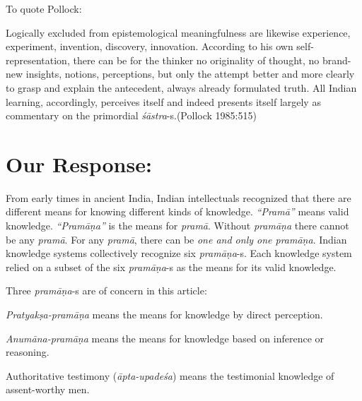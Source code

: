 To quote Pollock:
\begin{myquote}
Logically excluded from epistemological meaningfulness are likewise experience, experiment, invention, discovery, innovation.  According to his own self-representation, there can be for the thinker no originality of thought, no brand-new insights, notions, perceptions, but only the attempt better and more clearly to grasp and explain the antecedent, always already formulated truth. All Indian learning, accordingly, perceives itself and indeed presents itself largely as commentary on the primordial {\sl śāstra}-s.\hfill (Pollock 1985:515)
\end{myquote}

\section*{Our Response:}

From early times in ancient India, Indian intellectuals recognized that there are different means for knowing different kinds of knowledge. {\sl ``Pramā''} means valid knowledge.  {\sl ``Pramāṇa''} is the means for {\sl pramā}.  Without {\sl pramāṇa} there cannot be any {\sl pramā}.  For any {\sl pramā}, there can be {\sl one and only one pramāṇa}.  Indian knowledge systems collectively recognize six {\sl pramāṇa}-s. Each knowledge system relied on a subset of the six {\sl pramāṇa}-s as the means for its valid knowledge.

Three {\sl pramāṇa}-s are of concern in this article:
\begin{myquote}
{{\sl Pratyakṣa-pramāṇa}} means the means for knowledge by direct perception. 

{{\sl Anumāna-pramāṇa}} means the means for knowledge based on inference or reasoning.  

Authoritative testimony {({\sl āpta-upadeśa})} means the testimonial knowledge of assent-worthy men.
\end{myquote}

